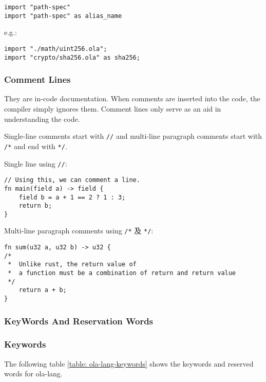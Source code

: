 \begin{lstlisting}
import "path-spec"
import "path-spec" as alias_name
\end{lstlisting}

e.g.:

\begin{lstlisting}
import "./math/uint256.ola";
import "crypto/sha256.ola" as sha256;
\end{lstlisting}

\subsubsection{Comment Lines}

They are in-code documentation. When comments are inserted into the code, the compiler simply ignores them. Comment lines only serve as an aid in understanding the code.

Single-line comments start with \texttt{//} and multi-line paragraph comments start with \texttt{/*} and end with \texttt{*/}.

Single line using \texttt{//}:
\begin{lstlisting}
// Using this, we can comment a line.
fn main(field a) -> field {
    field b = a + 1 == 2 ? 1 : 3;
    return b;
}
\end{lstlisting}

Multi-line paragraph comments using \texttt{/*} 及 \texttt{*/}:
\begin{lstlisting}
fn sum(u32 a, u32 b) -> u32 {
/* 
 *  Unlike rust, the return value of 
 *  a function must be a combination of return and return value
 */
    return a + b;
}
\end{lstlisting}



\subsubsection{KeyWords And Reservation Words }

\subsubsection*{Keywords} 

The following table \ref{table: ola-lang-keywords} shows the keywords and reserved words for ola-lang.

